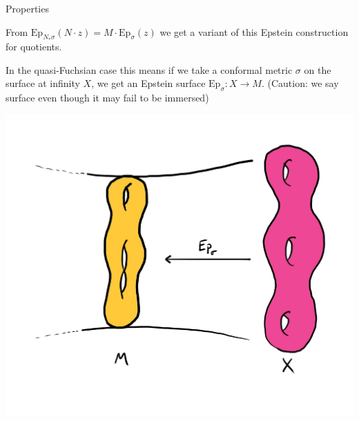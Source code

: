 \documentclass[professionalfont]{beamer}
\begin{document}



\begin{frame}{Properties}

From $\mathrm{Ep}_{N_*\sigma}(N \cdot z) = M \cdot \mathrm{Ep}_{\sigma}(z)$ we get a variant of this Epstein construction for quotients. 
\newline


In the quasi-Fuchsian case this means if we take a conformal metric $\sigma$ on the surface at infinity $X$, we get an Epstein surface $\mathrm{Ep}_\sigma: X \to M$. (Caution: we say surface even though it may fail to be immersed)

\centering\includegraphics[scale=0.11]{Quotients.jpg}

\end{frame}


\end{document}
